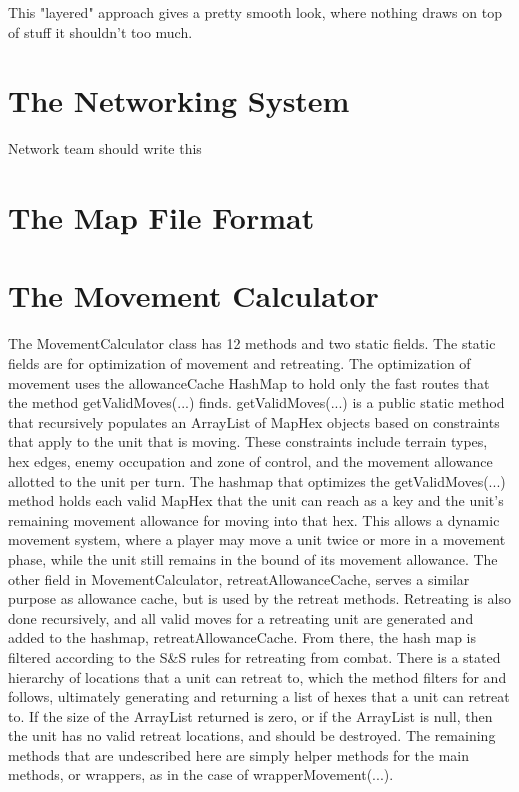\documentclass[12pt,a4paper]{article}
\begin{document}
This "layered" approach gives a pretty smooth look, where nothing draws on top
of stuff it shouldn't too much.

\section{The Networking System}
Network team should write this

\section{The Map File Format}

\section{The Movement Calculator}
The MovementCalculator class has 12 methods and two static fields. The static 
fields are for optimization of movement and retreating. The optimization of 
movement uses the allowanceCache HashMap to hold only the fast routes that the 
method getValidMoves(...) finds. getValidMoves(...) is a public static method 
that recursively populates an ArrayList of MapHex objects based on constraints
that apply to the unit that is moving. These constraints include terrain types, 
hex edges, enemy occupation and zone of control, and the movement allowance 
allotted to the unit per turn. The hashmap that optimizes the getValidMoves(...)
method holds each valid MapHex that the unit can reach as a key and the unit's 
remaining movement allowance for moving into that hex. This allows a dynamic
movement system, where a player may move a unit twice or more in a movement 
phase, while the unit still remains in the bound of its movement allowance.
The other field in MovementCalculator, retreatAllowanceCache, serves a similar
purpose as allowance cache, but is used by the retreat methods. Retreating is
also done recursively, and all valid moves for a retreating unit are generated
and added to the hashmap, retreatAllowanceCache. From there, the hash map is 
filtered according to the S\&S rules for retreating from combat. There is a 
stated hierarchy of locations that a unit can retreat to, which the method 
filters for and follows, ultimately generating and returning a list of 
hexes that a unit can retreat to. If the size of the ArrayList returned is 
zero, or if the ArrayList is null, then the unit has no valid retreat 
locations, and should be destroyed. The remaining methods that are undescribed
here are simply helper methods for the main methods, or wrappers, as in the 
case of wrapperMovement(...). 
\end{document}
